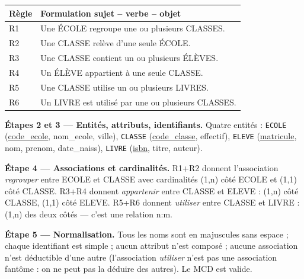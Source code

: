 \documentclass[11pt]{article}
\newcommand{\cle}[1]{{\popxbold\color{popdark}#1}}
\begin{document}
\begin{center}
\begin{tabularx}{\linewidth}{|l|X|}\hline
\rowcolor{popblueL}
\textbf{Règle} & \textbf{Formulation sujet -- verbe -- objet} \\\hline
R1 & Une ÉCOLE regroupe une ou plusieurs CLASSES. \\\hline
R2 & Une CLASSE relève d'une seule ÉCOLE. \\\hline
R3 & Une CLASSE contient un ou plusieurs ÉLÈVES. \\\hline
R4 & Un ÉLÈVE appartient à une seule CLASSE. \\\hline
R5 & Une CLASSE utilise un ou plusieurs LIVRES. \\\hline
R6 & Un LIVRE est utilisé par une ou plusieurs CLASSES. \\\hline
\end{tabularx}
\end{center}

\textbf{Étapes 2 et 3 — Entités, attributs, identifiants.} Quatre entités : \texttt{ECOLE} (\underline{code\_ecole}, nom\_ecole, ville), \texttt{CLASSE} (\underline{code\_classe}, effectif), \texttt{ELEVE} (\underline{matricule}, nom, prenom, date\_naiss), \texttt{LIVRE} (\underline{isbn}, titre, auteur).

\textbf{Étape 4 — Associations et cardinalités.} R1+R2 donnent l'association \emph{regrouper} entre ECOLE et CLASSE avec cardinalités (1,n) côté ECOLE et (1,1) côté CLASSE. R3+R4 donnent \emph{appartenir} entre CLASSE et ELEVE : (1,n) côté CLASSE, (1,1) côté ELEVE. R5+R6 donnent \emph{utiliser} entre CLASSE et LIVRE : (1,n) des deux côtés — c'est une relation \cle{n:m}.

\textbf{Étape 5 — Normalisation.} Tous les noms sont en majuscules sans espace ; chaque identifiant est simple ; aucun attribut n'est composé ; aucune association n'est déductible d'une autre (l'association \emph{utiliser} n'est pas une association fantôme : on ne peut pas la déduire des autres). Le MCD est valide.
\end{document}
